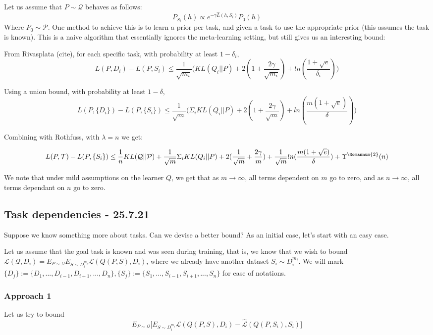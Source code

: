 \documentclass[letterpaper]{article}
\theoremstyle{definition}
\begin{document}
Let us assume that $P\sim \mathcal{Q}$ behaves as follows:
$$P_{S_i}(h)\propto e^{-\gamma \hat{L}(h,S_i)}P_0(h)$$
Where $P_0\sim \mathcal{P}$. One method to achieve this is to learn a prior per task, and given a task to use the appropriate prior (this assumes the task is known). This is a naive algorithm that essentially ignores the meta-learning setting, but still gives us an interesting bound:

From Rivasplata (cite), for each specific task, with probability at least $1-\delta_i$,
$$L(P,D_i)-L(P,S_i)\leq \frac{1}{\sqrt{m_i}}\bigl ( KL(Q_i||P) + 2(1+\frac{2\gamma}{\sqrt{m_i}})+ln(\frac{1+\sqrt{e}}{\delta_i}) \bigr )$$

Using a union bound, with probability at least $1-\delta$,
$$L(P,\{D_i\})-L(P,\{S_i\})\leq \frac{1}{\sqrt{m}}\bigl ( \Sigma_i KL(Q_i||P) + 2(1+\frac{2\gamma}{\sqrt{m}})+ln(\frac{m(1+\sqrt{e})}{\delta}) \bigr )$$

Combining with Rothfuss, with $\lambda=n$ we get:

$$L(P,\mathcal{T})-L(P,\{S_i\})\leq \frac{1}{n}KL(\mathcal{Q}||\mathcal{P}) + \frac{1}{\sqrt{m}}\Sigma_i KL(Q_i||P) + 2(\frac{1}{\sqrt{m}}+\frac{2\gamma}{m})+\frac{1}{\sqrt{m}}ln(\frac{m(1+\sqrt{e})}{\delta}) + \Upsilon^{\text{\Romannum{2}}}(n)$$
	
We note that under mild assumptions on the learner $Q$, we get that as $m\rightarrow\infty$, all terms dependent on $m$ go to zero, and as $n\rightarrow\infty$, all terms dependant on $n$ go to zero.

\subsection{Task dependencies - 25.7.21}

Suppose we know something more about tasks. Can we devise a better bound?
As an initial case, let's start with an easy case.

Let us assume that the goal task is known and was seen during training, that is, we know that we wish to bound $\mathcal{L}(\mathcal{Q}, D_i)=E_{P\sim \mathcal{Q}}E_{S\sim D_i^{m_i}}\mathcal{L}(Q(P, S), D_i)$, where we already have another dataset $S_i\sim D_i^{m_i}$. We will mark $\{D_j\}:=\{D_1,...,D_{i-1},D_{i+1},...,D_n\}, \{S_j\}:=\{S_1,...,S_{i-1},S_{i+1},...,S_n\}$ for ease of notations.

\subsubsection*{Approach 1}
Let us try to bound
$$E_{P\sim \mathcal{Q}}\bigl [E_{S\sim D_i^{m_i}}\mathcal{L}(Q(P, S), D_i)-\hat{\mathcal{L}}(Q(P, S_i), S_i)\bigr ]$$
\end{document}
